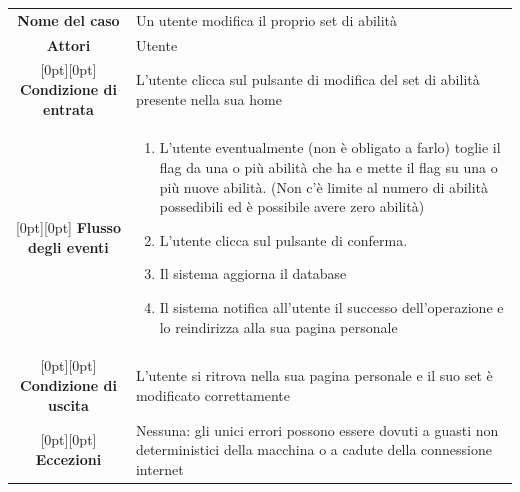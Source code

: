\documentclass[a4paper,12pt]{article}
\begin{document}
\begin{tabularx}{\textwidth}{|c|X|}
\rowcolor[gray]{.9}\hline  \textbf{Nome del caso} & Un utente modifica il proprio set di abilità \\
\rowcolor[gray]{.9}\hline  \textbf{Attori} & Utente \\ 
\rowcolor[gray]{.9}\hline \raisebox{-1ex}[0pt][0pt]{ \textbf{Condizione di entrata}} & L'utente clicca sul pulsante di modifica del set di abilità presente nella sua home \\
\rowcolor[gray]{.9}\hline \raisebox{-11ex}[0pt][0pt]{ \textbf{Flusso degli eventi}} & 
\begin{enumerate}
\itemsep0em 
\item L'utente eventualmente (non è obligato a farlo) toglie il flag da una o più abilità che ha e mette il flag su una o più nuove abilità. (Non c'è limite al numero di abilità possedibili ed è possibile avere zero abilità)
\item L'utente clicca sul pulsante di conferma.
\item Il sistema aggiorna il database
\item Il sistema notifica all'utente il successo dell'operazione e lo reindirizza alla sua pagina personale
\end{enumerate}
 \\ 
\rowcolor[gray]{.9}\hline \raisebox{-1ex}[0pt][0pt]{ \textbf{Condizione di uscita}} & L'utente si ritrova nella sua pagina personale e il suo set è modificato correttamente \\
\rowcolor[gray]{.9}\hline \raisebox{-2ex}[0pt][0pt]{ \textbf{Eccezioni}} & Nessuna: gli unici errori possono essere dovuti a guasti non deterministici della macchina o a cadute della connessione internet
\\
\hline 
\end{tabularx} \clearpage
\end{document}
